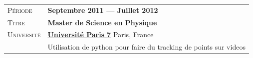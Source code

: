\documentclass[a4paper, oneside, final]{scrartcl} %
\newcommand{\gray}{\rowcolor[gray]{.90}} %
\begin{document}
\begin{center}
\vspace{12pt}

\begin{tabularx}{0.97\linewidth}{>{\raggedleft\scshape}p{2cm}X}
\gray Période & \textbf{Septembre 2011 --- Juillet 2012}\\
\gray Titre & \textbf{Master de Science en Physique}\\
\gray Université & \textbf{\href{http://www.univ-paris-diderot.fr/}{Université Paris 7}} \hfill Paris, France\\
& Utilisation de python pour faire du tracking de points sur videos
\end{tabularx}

\vspace{12pt}



%




\end{center}
\end{document}
